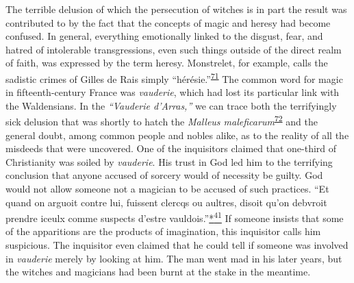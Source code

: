 The terrible delusion of which the persecution of witches is in part the
result was contributed to by the fact that the concepts of magic and
heresy had become confused. In general, everything emotionally linked to
the disgust, fear, and hatred of intolerable
\protect\hypertarget{18_Chapter_Eleven__THE_FORMS_OF_THO.xhtmlux5cux23page_289}{}{}transgressions,
even such things outside of the direct realm of faith, was expressed by
the term heresy. Monstrelet, for example, calls the sadistic crimes of
Gilles de Rais simply
``hérésie.''\textsuperscript{\protect\hypertarget{18_Chapter_Eleven__THE_FORMS_OF_THO.xhtmlux5cux23id_492}{\protect\hyperlink{23_NOTES.xhtmlux5cux23id_493}{71}}}
The common word for magic in fifteenth-century France was
\emph{vauderie}, which had lost its particular link with the
Waldensians. In the \emph{``Vauderie d'Arras,''} we can trace both the
terrifyingly sick delusion that was shortly to hatch the \emph{Malleus
maleficarum}\textsuperscript{\protect\hypertarget{18_Chapter_Eleven__THE_FORMS_OF_THO.xhtmlux5cux23id_490}{\protect\hyperlink{23_NOTES.xhtmlux5cux23id_491}{72}}}
and the general doubt, among common people and nobles alike, as to the
reality of all the misdeeds that were uncovered. One of the inquisitors
claimed that one-third of Christianity was soiled by \emph{vauderie}.
His trust in God led him to the terrifying conclusion that anyone
accused of sorcery would of necessity be guilty. God would not allow
someone not a magician to be accused of such practices. ``Et quand on
arguoit contre lui, fuissent clercqs ou aultres, disoit qu'on debvroit
prendre iceulx comme suspects d'estre
vauldois.''\protect\hypertarget{18_Chapter_Eleven__THE_FORMS_OF_THO.xhtmlux5cux23id_2643}{\protect\hyperlink{23_NOTES.xhtmlux5cux23id_2644}{*\textsuperscript{41}}}
If someone insists that some of the apparitions are the products of
imagination, this inquisitor calls him suspicious. The inquisitor even
claimed that he could tell if someone was involved in \emph{vauderie}
merely by looking at him. The man went mad in his later years, but the
witches and magicians had been burnt at the stake in the meantime.


